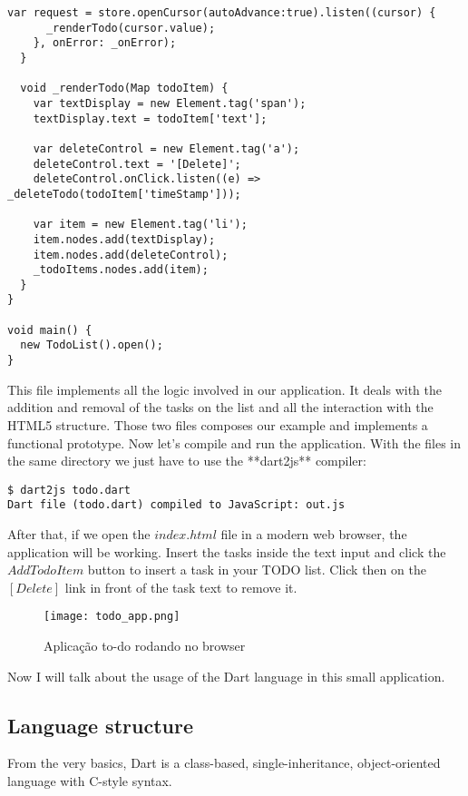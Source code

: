\begin{lstlisting}[label=dtd,caption=Dart to-do list example]
    var request = store.openCursor(autoAdvance:true).listen((cursor) {
      _renderTodo(cursor.value);
    }, onError: _onError);
  }

  void _renderTodo(Map todoItem) {
    var textDisplay = new Element.tag('span');
    textDisplay.text = todoItem['text'];

    var deleteControl = new Element.tag('a');
    deleteControl.text = '[Delete]';
    deleteControl.onClick.listen((e) => _deleteTodo(todoItem['timeStamp']));

    var item = new Element.tag('li');
    item.nodes.add(textDisplay);
    item.nodes.add(deleteControl);
    _todoItems.nodes.add(item);
  }
}

void main() {
  new TodoList().open();
}
\end{lstlisting}

This file implements all the logic involved in our application. It deals with
the addition and removal of the tasks on the list and all the interaction with
the HTML5 structure. Those two files composes our example and implements a
functional prototype. Now let's compile and run the application. With the files
in the same directory we just have to use the **dart2js** compiler:

\begin{verbatim}
$ dart2js todo.dart
Dart file (todo.dart) compiled to JavaScript: out.js
\end{verbatim}


After that, if we open the $index.html$ file in a modern web browser, the
application will be working. Insert the tasks inside the text input and click
the $Add Todo Item$ button to insert a task in your TODO list. Click then on the
$[Delete]$ link in front of the task text to remove it.

\begin{figure}[!htb]
  \centering
  \texttt{[image: todo\_app.png]}
  \caption{Aplicação to-do rodando no browser}
  \label{Rotulo}
\end{figure}

Now I will talk about the usage of the Dart language in this small application.

\subsection{Language structure}

From the very basics, Dart is a class-based, single-inheritance, object-oriented
language with C-style syntax.


